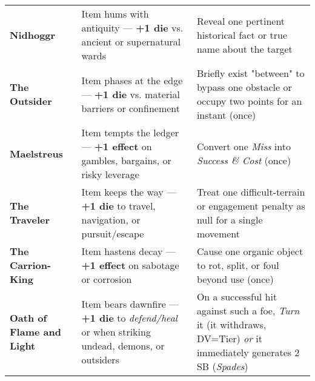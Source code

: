 \documentclass[12pt,twoside]{book}
\begin{document}
\begin{table}[htbp]
\begin{tabular}{>{\bfseries}p{3.2cm} >{\raggedright\arraybackslash}p{6.1cm} >{\raggedright\arraybackslash}p{6.1cm}}
Nidhoggr & Item hums with antiquity — \textbf{+1 die} vs. ancient or supernatural wards & Reveal one pertinent historical fact or true name about the target \\
The Outsider & Item phases at the edge — \textbf{+1 die} vs. material barriers or confinement & Briefly exist "between" to bypass one obstacle or occupy two points for an instant (once) \\
Maelstreus & Item tempts the ledger — \textbf{+1 effect} on gambles, bargains, or risky leverage & Convert one \emph{Miss} into \emph{Success \& Cost} (once) \\
The Traveler & Item keeps the way — \textbf{+1 die} to travel, navigation, or pursuit/escape & Treat one difficult-terrain or engagement penalty as null for a single movement \\
The Carrion-King & Item hastens decay — \textbf{+1 effect} on sabotage or corrosion & Cause one organic object to rot, split, or foul beyond use (once) \\
Oath of Flame and Light & Item bears dawnfire — \textbf{+1 die} to \emph{defend/heal} or when striking undead, demons, or outsiders & On a successful hit against such a foe, \emph{Turn} it (it withdraws, DV=Tier) \emph{or} it immediately generates 2 SB (\emph{Spades}) \\
\bottomrule
\end{tabular}
\end{table}
\end{document}
